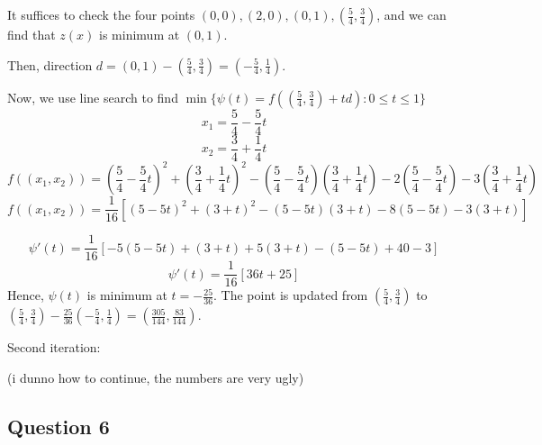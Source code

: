 \documentclass{article}
\begin{document}
It suffices to check the four points $(0,0), (2,0), (0,1), (\frac{5}{4},\frac{3}{4})$, and we can find that $z(x)$ is minimum at $(0,1)$.

Then, direction $d = (0,1) - (\frac{5}{4},\frac{3}{4}) = (-\frac{5}{4},\frac{1}{4})$.

Now, we use line search to find $\min \{ \psi(t) = f((\frac{5}{4},\frac{3}{4}) + td) : 0 \leq t \leq 1\}$
\[x_1 = \frac{5}{4} - \frac{5}{4}t\]
\[x_2 = \frac{3}{4} + \frac{1}{4}t\]
\[f((x_1,x_2)) = (\frac{5}{4} - \frac{5}{4}t)^2 + (\frac{3}{4} + \frac{1}{4}t)^2 - (\frac{5}{4} - \frac{5}{4}t)(\frac{3}{4} + \frac{1}{4}t) - 2(\frac{5}{4} - \frac{5}{4}t) - 3(\frac{3}{4} + \frac{1}{4}t)\]
\[f((x_1,x_2)) = \frac{1}{16}[(5 - 5t)^2 + (3 + t)^2 - (5 - 5t)(3 + t) - 8(5 - 5t) - 3(3 + t)]\]

\[\psi'(t) = \frac{1}{16}[-5(5 - 5t) + (3 + t) + 5(3 + t) - (5 - 5t) + 40 - 3]\]
\[\psi'(t) = \frac{1}{16}[36t + 25]\]
Hence, $\psi(t)$ is minimum at $t = -\frac{25}{36}$. The point is updated from $(\frac{5}{4},\frac{3}{4})$ to $(\frac{5}{4},\frac{3}{4}) - \frac{25}{36}(-\frac{5}{4},\frac{1}{4}) = (\frac{305}{144}, \frac{83}{144})$.

Second iteration:

(i dunno how to continue, the numbers are very ugly)

\subsection*{Question 6}
\end{document}
